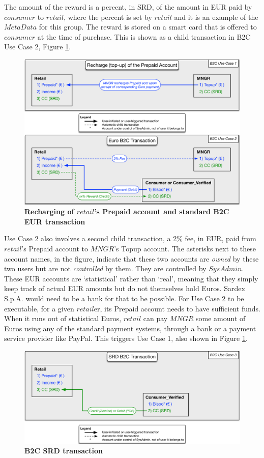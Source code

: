The amount of the reward is a percent, in SRD, of the amount in EUR paid by $consumer$ to $retail$, where the percent is set by $retail$ and it is an example of the $MetaData$ for this group. The reward is stored on a smart card that is offered to $consumer$ at the time of purchase. This is shown as a child transaction in B2C Use Case 2, Figure \ref{fig:B2C1}.

\begin{figure}[htbp]
\centering
\includegraphics[width=15cm]{Figures/B2C1}
\caption{\small\textbf{Recharging of $retail$'s Prepaid account and standard B2C EUR transaction}}
\label{fig:B2C1}
\end{figure}

Use Case 2 also involves a second child transaction, a 2\% fee, in EUR, paid from $retail$'s Prepaid account to $MNGR$'s Topup account. The asterisks next to these account names, in the figure, indicate that these two accounts are \emph{owned} by these two users but are not \emph{controlled} by them. They are controlled by $SysAdmin$. These EUR accounts are `statistical' rather than `real', meaning that they simply keep track of actual EUR amounts but do not themselves hold Euros. Sardex S.p.A. would need to be a bank for that to be possible. For Use Case 2 to be executable, for a given $retail$er, its Prepaid account needs to have sufficient funds. When it runs out of statistical Euros, $retail$ can pay $MNGR$ some amount of Euros using any of the standard payment systems, through a bank or a payment service provider like PayPal. This triggers Use Case 1, also shown in Figure \ref{fig:B2C1}.

\begin{figure}[h]
\centering
\includegraphics[width=15cm]{Figures/B2C2}
\caption{\small\textbf{B2C SRD transaction}}
\label{fig:B2C2}
\end{figure}


